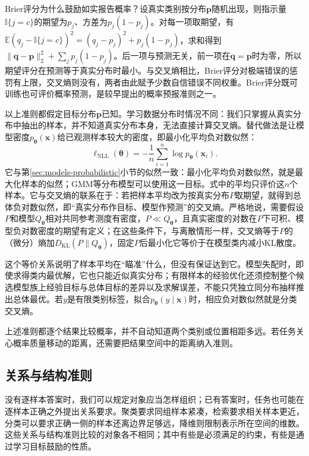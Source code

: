 Brier评分为什么鼓励如实报告概率？设真实类别按分布$\bm{p}$随机出现，则指示量$\mathbb{I}\{j=c\}$的期望为$p_j$、方差为$p_j(1-p_j)$。对每一项取期望，有$\mathbb{E}(q_j-\mathbb{I}\{j=c\})^2=(q_j-p_j)^2+p_j(1-p_j)$，求和得到$\lVert\bm{q}-\bm{p}\rVert_2^2+\sum_j p_j(1-p_j)$。后一项与预测无关，前一项在$\bm{q}=\bm{p}$时为零，所以期望评分在预测等于真实分布时最小。与交叉熵相比，Brier评分对极端错误的惩罚有上限，交叉熵则没有，两者由此赋予少数自信错误不同权重。Brier评分既可训练也可评价概率预测，是较早提出的概率预报准则之一。

以上准则都假定目标分布$\bm{p}$已知。学习数据分布时情况不同：我们只掌握从真实分布中抽出的样本，并不知道真实分布本身，无法直接计算交叉熵。替代做法是让模型密度$p_{\bm{\theta}}(\bm{x})$给已观测样本较大的密度，即最小化平均负对数似然：
\begin{equation}
  \ell_{\mathrm{NLL}}(\bm{\theta})
  =-\frac{1}{n}\sum_{i=1}^{n}\log p_{\bm{\theta}}(\bm{x}_i).
  \label{eq:models-negative-log-likelihood}
\end{equation}
它与第\ref{sec:models-probabilistic}小节的似然一致：最小化平均负对数似然，就是最大化样本的似然；GMM等分布模型可以使用这一目标。式中的平均只评价这$n$个样本。它与交叉熵的联系在于：若把样本平均改为按真实分布$P$取期望，就得到总体负对数似然，即“真实分布作目标、模型作预测”的交叉熵。严格地说，需要假设$P$和模型$Q_{\bm{\theta}}$相对共同参考测度有密度，$P\ll Q_{\bm{\theta}}$，且真实密度的对数在$P$下可积、模型负对数密度的期望有定义；在这些条件下，与离散情形一样，交叉熵等于$P$的（微分）熵加$D_{\mathrm{KL}}(P\|Q_{\bm{\theta}})$，固定$P$后最小化它等价于在模型类内减小KL散度。

这个等价关系说明了样本平均在“瞄准”什么，但没有保证达到它。模型失配时，即使求得类内最优解，它也只能近似真实分布；有限样本的经验优化还须控制整个候选模型族上经验目标与总体目标的差异以及求解误差，不能只凭独立同分布抽样推出总体最优。若$y$是有限类别标签，拟合$p_{\bm{\theta}}(y\mid\bm{x})$时，相应负对数似然就是分类交叉熵。

上述准则都逐个结果比较概率，并不自动知道两个类别或位置相距多远。若任务关心概率质量移动的距离，还需要把结果空间中的距离纳入准则。

\subsection{关系与结构准则}
\label{sec:models-spatial-objectives}

没有逐样本答案时，我们可以规定对象应当怎样组织；已有答案时，任务也可能在逐样本正确之外提出关系要求。聚类要求同组样本紧凑，检索要求相关样本更近，分类可以要求正确一侧的样本还离边界足够远，降维则限制表示所在空间的维数。这些关系与结构准则比较的对象各不相同；其中有些是必须满足的约束，有些是通过学习目标鼓励的性质。

